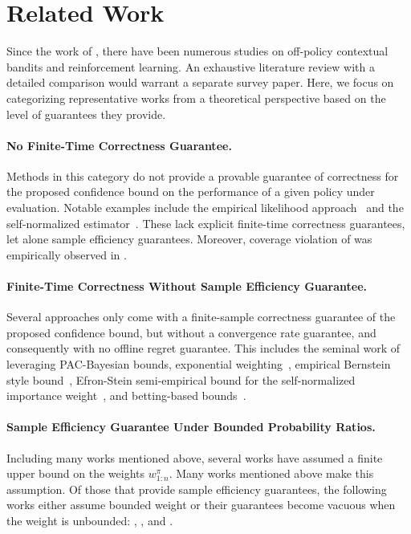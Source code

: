 \section{Related Work}
\label{sec:related}

Since the work of \citet{swaminathan15batch}, there have been numerous studies on off-policy contextual bandits and reinforcement learning.
An exhaustive literature review with a detailed comparison would warrant a separate survey paper.
Here, we focus on categorizing representative works from a theoretical perspective based on the level of guarantees they provide.

%
%
%

\paragraph{No Finite-Time Correctness Guarantee.}
Methods in this category do not provide a provable guarantee of correctness for the proposed confidence bound on the performance of a given policy under evaluation. Notable examples include the empirical likelihood approach~\citep{karampatziakis20empirical} and the self-normalized estimator~\citep{swaminathan15batch}. These lack explicit finite-time correctness guarantees, let alone sample efficiency guarantees. Moreover, coverage violation of \citet{karampatziakis20empirical} was empirically observed in \citet[Fig.~3]{kuzborskij21confident}.

\paragraph{Finite-Time Correctness Without Sample Efficiency Guarantee.}
Several approaches only come with a finite-sample correctness guarantee of the proposed confidence bound, but without a convergence rate guarantee, and consequently with no offline regret guarantee.
This includes the seminal work of \citet{london19bayesian} leveraging PAC-Bayesian bounds, exponential weighting~\citep{aouali23exponential}, empirical Bernstein style bound~\citep{sakhi23pac}, Efron-Stein semi-empirical bound for the self-normalized importance weight~\citep{kuzborskij19efron,kuzborskij21confident}, and betting-based bounds~\citep{karampatziakis21off,Waudby-Smith--Wu--Ramdas--Karampatziakis--Mineiro2022}.

\paragraph{Sample Efficiency Guarantee Under Bounded Probability Ratios.}
Including many works mentioned above, several works have assumed a finite upper bound on the weights $w_{1:n}^\pi$.
%
Many works mentioned above make this assumption.
%
Of those that provide sample efficiency guarantees, the following works either assume bounded weight or their guarantees become vacuous when the weight is unbounded: \citet[Corollary 4.3]{jin22policy}, \citet{wang24oracle}, and \citet{zenati23sequential}. 

